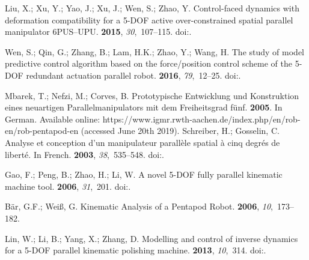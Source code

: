 \documentclass[robotics,article,accept,moreauthors,pdftex]{Definitions/mdpi}
\begin{document}
\begin{thebibliography}{999}
Liu, X.; Xu, Y.; Yao, J.; Xu, J.; Wen, S.; Zhao, Y.
\newblock Control-faced dynamics with deformation compatibility for a 5-DOF
  active over-constrained spatial parallel manipulator 6PUS--UPU.
 {\bf 2015}, {\em 30},~107--115.
\newblock
  doi:{\href{https://doi.org/10.1016/j.mechatronics.2015.06.014}{}}.

Wen, S.; Qin, G.; Zhang, B.; Lam, H.K.; Zhao, Y.; Wang, H.
\newblock The study of model predictive control algorithm based on the
  force/position control scheme of the 5-DOF redundant actuation parallel
  robot.
 {\bf 2016}, {\em 79},~12--25.
\newblock
  doi:{\href{https://doi.org/10.1016/j.robot.2016.02.002}{}}.

Mbarek, T.; Nefzi, M.; Corves, B.
\newblock Prototypische Entwicklung und Konstruktion eines neuartigen
  Parallelmanipulators mit dem Freiheitsgrad fünf.
 {\bf 2005}.
\newblock In German. Available online:
  https://www.igmr.rwth-aachen.de/index.php/en/rob-en/rob-pentapod-en (accessed
  June 20th 2019).
Schreiber, H.; Gosselin, C.
\newblock Analyse et conception d’un manipulateur parallèle spatial à cinq   degrés de liberté. In French.
 {\bf 2003}, {\em 38},~535--548.
\newblock
  doi:{\href{https://doi.org/10.1016/S0094-114X(03)00007-7}{}}.

Gao, F.; Peng, B.; Zhao, H.; Li, W.
\newblock A novel 5-DOF fully parallel kinematic machine tool.
  {\bf 2006}, {\em 31},~201.
\newblock
  doi:{\href{https://doi.org/10.1007/s00170-005-0171-1}{}}.

Bär, G.F.; Weiß, G.
\newblock Kinematic Analysis of a Pentapod Robot.
 {\bf 2006}, {\em
    10},~173--182.

Lin, W.; Li, B.; Yang, X.; Zhang, D.
\newblock Modelling and control of inverse dynamics for a 5-DOF parallel
  kinematic polishing machine.
 {\bf 2013},
  {\em 10},~314.
\newblock
  doi:{\href{https://doi.org/10.5772/54966}{}}.


\end{thebibliography}
\end{document}
